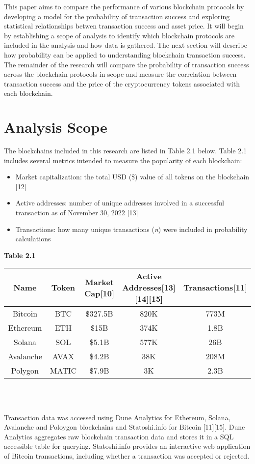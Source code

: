 \documentclass[12pt]{article}
\begin{document}
This paper aims to compare the performance of various blockchain protocols by developing a model for the probability of transaction success and exploring statistical relationships betwen transaction success and asset price. It will begin by establishing a scope of analysis to identify which blockchain protocols are included in the analysis and how data is gathered. The next section will describe how probability can be applied to understanding blockchain transaction success. The remainder of the research will compare the probability of transaction success across the blockchain protocols in scope and measure the correlation between transaction success and the price of the cryptocurrency tokens associated with each blockchain.

\section{Analysis Scope}
The blockchains included in this research are listed in Table 2.1 below. Table 2.1 includes several metrics intended to measure the popularity of each blockchain:
\begin{itemize}
	\item Market capitalization: the total USD (\$) value of all tokens on the blockchain [12]
	\item Active addresses: number of unique addresses involved in a successful transaction as of November 30, 2022 [13] 
	\item Transactions: how many unique transactions (\emph{n}) were included in probability calculations \\
\end{itemize}
\textbf{Table 2.1}\\
\begin{tabular}{| c | c | c | c | c |}
\hline
\textbf{Name} & \textbf{Token} & \textbf{Market Cap}[10] & \textbf{Active Addresses}[13][14][15] & \textbf{Transactions}[11] \\
\hline
Bitcoin  & BTC & \$327.5B & 820K&773M\\
Ethereum & ETH & \$15B & 374K&1.8B\\
Solana & SOL & \$5.1B & 577K&26B\\
Avalanche & AVAX & \$4.2B & 38K& 208M \\
Polygon & MATIC & \$7.9B & 3K&2.3B\\
\hline
\end{tabular}\\
\\
\par Transaction data was accessed using Dune Analytics for Ethereum, Solana, Avalanche and Poloygon blockchains and Statoshi.info for Bitcoin [11][15]. Dune Analytics aggregates raw blockchain transaction data and stores it in a SQL accessible table for querying. Statoshi.info provides an interactive web application of Bitcoin transactions, including whether a transaction was accepted or rejected. 
\end{document}
